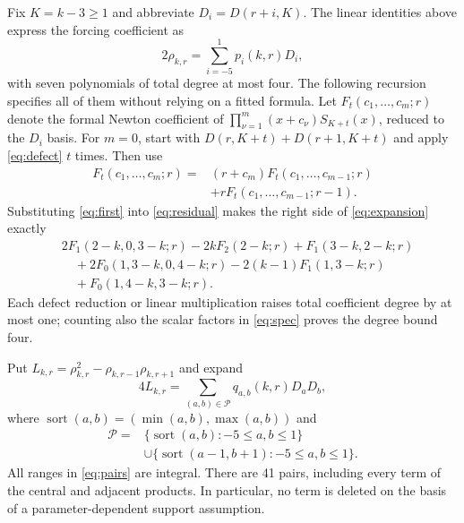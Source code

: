 \documentclass[11pt]{article}
\DeclareMathOperator{\sort}{sort}
\begin{document}
Fix $K=k-3\geq1$ and abbreviate $D_i=D(r+i,K)$. The linear identities
above express the forcing coefficient as
\begin{equation}\label{eq:expansion}
2\rho_{k,r}=\sum_{i=-5}^{1}p_i(k,r)D_i,
\end{equation}
with seven polynomials of total degree at most four. The following
recursion specifies all of them without relying on a fitted formula.
Let $F_t(c_1,\ldots,c_m;r)$ denote the formal Newton coefficient of
$\prod_{\nu=1}^m(x+c_\nu)S_{K+t}(x)$, reduced to the $D_i$ basis.
For $m=0$, start with $D(r,K+t)+D(r+1,K+t)$ and apply
\eqref{eq:defect} $t$ times. Then use
\begin{equation}\label{eq:F}
\begin{aligned}
F_t(c_1,\ldots,c_m;r)={}&(r+c_m)F_t(c_1,\ldots,c_{m-1};r)\\
&+rF_t(c_1,\ldots,c_{m-1};r-1).
\end{aligned}
\end{equation}
Substituting \eqref{eq:first} into \eqref{eq:residual} makes the right
side of \eqref{eq:expansion} exactly
\begin{equation}\label{eq:spec}
\begin{aligned}
&2F_1(2-k,0,3-k;r)-2kF_2(2-k;r)+F_1(3-k,2-k;r)\\
&\quad+2F_0(1,3-k,0,4-k;r)-2(k-1)F_1(1,3-k;r)\\
&\quad+F_0(1,4-k,3-k;r).
\end{aligned}
\end{equation}
Each defect reduction or linear multiplication raises total coefficient
degree by at most one; counting also the scalar factors in
\eqref{eq:spec} proves the degree bound four.

Put $L_{k,r}=\rho_{k,r}^2-\rho_{k,r-1}\rho_{k,r+1}$ and expand
\begin{equation}\label{eq:quadratic}
4L_{k,r}=\sum_{(a,b)\in\mathcal P}q_{a,b}(k,r)D_aD_b,
\end{equation}
where $\sort(a,b)=(\min(a,b),\max(a,b))$ and
\begin{equation}\label{eq:pairs}
\begin{aligned}
\mathcal P={}&\{\sort(a,b):-5\leq a,b\leq1\}\\
&\cup\{\sort(a-1,b+1):-5\leq a,b\leq1\}.
\end{aligned}
\end{equation}
All ranges in \eqref{eq:pairs} are integral. There are 41 pairs, including
every term of the central and adjacent products. In particular, no term
is deleted on the basis of a parameter-dependent support assumption.
\end{document}
